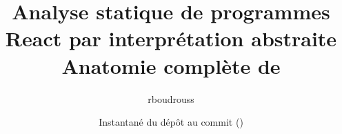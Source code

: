 \documentclass[11pt,a4paper,openany]{book}
\title{Analyse statique de programmes React par interprétation abstraite\\[1ex]
  {\large Anatomie complète de \reactant}}
\author{rboudrouss}
\date{Instantané du dépôt au commit \snapshotCommit{} (\snapshotDate)}
\begin{document}
\frontmatter
\maketitle

\tableofcontents
\listoffigures
\lstlistoflistings
\mainmatter

\backmatter


\printindex
\end{document}
